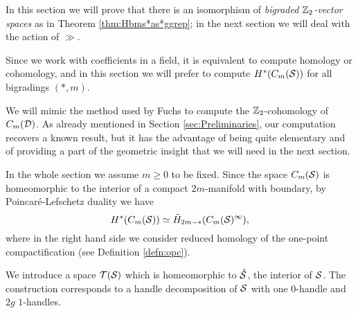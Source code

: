 
In this section we will prove that there is an isomorphism of \emph{bigraded $\Z_2$-vector spaces}
as in Theorem \ref{thm:Hbms*as*ggrep}; in the next section we will deal with the action of
$\gg$.

Since we work with coefficients in a field, it is equivalent to compute homology or cohomology,
and in this section we will prefer to compute $H^*(\cms)$ for all bigradings $(*,m)$.

We will mimic the method used by Fuchs \cite{Fuchs:CohomBraidModtwo} to compute the $\Z_2$-cohomology
of $C_m(\D)$.
As already mentioned in Section \ref{sec:Preliminaries}, our computation recovers a known result, but it has the advantage of
being quite elementary and of providing a part of
the geometric insight that we will need in the next section.

In the whole section we assume $m\geq 0$ to be fixed.
Since the space $\cms$ is homeomorphic to the interior of a compact
$2m$-manifold with boundary, by Poincaré-Lefschetz
duality we have
\[
 H^*(\cms)\simeq \tilde H_{2m-*}(\cms^{\infty}),
\]
where in the right hand side we consider reduced homology of the one-point compactification (see Definition \ref{defn:opc}).

We introduce a space $\T(\S)$ which is homeomorphic to $\mrS$, the interior of $\S$. The construction
corresponds to a handle decomposition of $\S$ with one $0$-handle and $2g$ $1$-handles.

